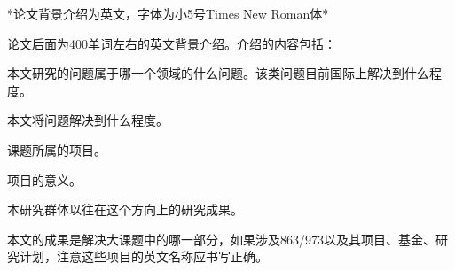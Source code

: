 \documentclass{cjc}
\begin{document}


\nocite{*}





\newpage





\makebiographies


\begin{background}
*论文背景介绍为英文，字体为小5号Times New Roman体*

论文后面为400单词左右的英文背景介绍。介绍的内容包括：

本文研究的问题属于哪一个领域的什么问题。该类问题目前国际上解决到什么程度。

本文将问题解决到什么程度。

课题所属的项目。

项目的意义。

本研究群体以往在这个方向上的研究成果。

本文的成果是解决大课题中的哪一部分，如果涉及863/973以及其项目、基金、研究计划，注意这些项目的英文名称应书写正确。
\end{background}
\end{document}
